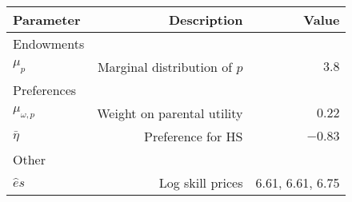 \begin{tabular}{lrr}
\hline
Parameter & Description  & Value  \\ 
\hline
Endowments &   &   \\ 
$\mu_{p}$ & Marginal distribution of $p$  & $3.8$  \\ 
Preferences &   &   \\ 
$\mu_{\omega,p}$ & Weight on parental utility  & $0.22$  \\ 
$\bar{\eta}$ & Preference for HS  & $-0.83$  \\ 
Other &   &   \\ 
$\hat{e}{s}$ & Log skill prices  & 6.61, 6.61, 6.75  \\ 
\hline
\end{tabular}%
